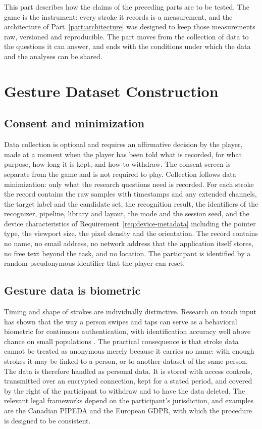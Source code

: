 This part describes how the claims of the preceding parts are to be tested. The game is the instrument: every stroke it records is a measurement, and the architecture of Part~\ref{part:architecture} was designed to keep those measurements raw, versioned and reproducible. The part moves from the collection of data to the questions it can answer, and ends with the conditions under which the data and the analyses can be shared.

\chapter{Gesture Dataset Construction}\label{ch:dataset}

\section{Consent and minimization}

Data collection is optional and requires an affirmative decision by the player, made at a moment when the player has been told what is recorded, for what purpose, how long it is kept, and how to withdraw. The consent screen is separate from the game and is not required to play. Collection follows data minimization: only what the research questions need is recorded. For each stroke the record contains the raw samples with timestamps and any extended channels, the target label and the candidate set, the recognition result, the identifiers of the recognizer, pipeline, library and layout, the mode and the session seed, and the device characteristics of Requirement~\ref{req:device-metadata} including the pointer type, the viewport size, the pixel density and the orientation. The record contains no name, no email address, no network address that the application itself stores, no free text beyond the task, and no location. The participant is identified by a random pseudonymous identifier that the player can reset.

\section{Gesture data is biometric}

Timing and shape of strokes are individually distinctive. Research on touch input has shown that the way a person swipes and taps can serve as a behavioral biometric for continuous authentication, with identification accuracy well above chance on small populations \cite{frank2013}.\evD{} The practical consequence is that stroke data cannot be treated as anonymous merely because it carries no name: with enough strokes it may be linked to a person, or to another dataset of the same person. The data is therefore handled as personal data. It is stored with access controls, transmitted over an encrypted connection, kept for a stated period, and covered by the right of the participant to withdraw and to have the data deleted. The relevant legal frameworks depend on the participant's jurisdiction, and examples are the Canadian PIPEDA and the European GDPR, with which the procedure is designed to be consistent.

